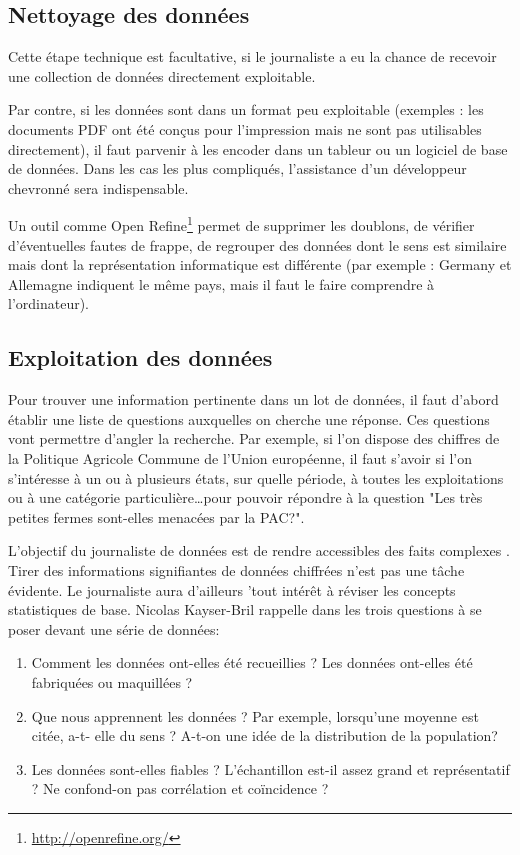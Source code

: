 \subsection{Nettoyage des données}

Cette étape technique est facultative, si le journaliste a eu la chance 
de recevoir une collection de données directement exploitable.

Par contre, si les données sont dans un format peu exploitable (exemples : les
documents PDF ont été conçus pour l'impression mais ne sont pas utilisables
directement), il faut parvenir à les encoder dans un tableur ou un logiciel 
de base de données. Dans les cas les plus compliqués, l'assistance d'un 
développeur chevronné sera indispensable.

Un outil comme Open Refine\footnote{\url{http://openrefine.org/}} permet de
supprimer les doublons, de vérifier d'éventuelles fautes de frappe, de regrouper
des données dont le sens est similaire mais dont la représentation informatique
est différente (par exemple : \og Germany \fg et \og Allemagne \fg indiquent le même 
pays, mais il faut le faire comprendre à l'ordinateur).

\subsection{Exploitation des données}

Pour trouver une information pertinente dans un lot de données, il faut d'abord établir
une liste de questions auxquelles on cherche une réponse. Ces questions vont permettre d'angler la recherche. Par exemple, si l'on dispose des chiffres de la Politique Agricole Commune de l'Union européenne, il faut s'avoir si l'on s'intéresse à un ou à plusieurs états, sur quelle période, à toutes les exploitations ou à une catégorie particulière\dots pour pouvoir répondre à la question "Les très petites fermes sont-elles menacées par la PAC?". 

L'objectif du journaliste de données est de rendre accessibles des faits complexes \cite {bradshaw}. 
Tirer des informations signifiantes de données chiffrées n'est pas une tâche 
évidente. Le journaliste aura d'ailleurs 'tout intérêt à réviser les concepts statistiques de base. 
Nicolas Kayser-Bril rappelle dans \cite{handbookfr} les trois questions à se poser 
devant une série de données:

\begin{enumerate}
\item Comment les données ont-elles été recueillies ? Les données ont-elles été 
fabriquées ou maquillées ? 
\item Que nous apprennent les données ? Par exemple, lorsqu'une moyenne est citée, a-t-
elle du sens ? A-t-on une idée de la distribution de la population?
\item Les données sont-elles fiables ? L'échantillon est-il assez grand et 
représentatif ? Ne confond-on pas corrélation et coïncidence ?
\end{enumerate}

